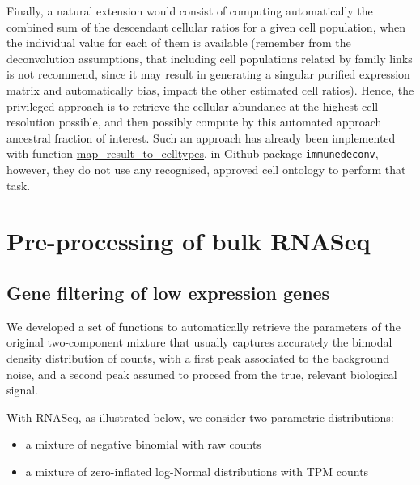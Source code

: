 Finally, a natural extension would consist of computing automatically the combined sum of the descendant cellular ratios for a given cell population, when the individual value for each of them is available (remember from the deconvolution assumptions, that including cell populations related by family links is not recommend, since it may result in generating a singular purified expression matrix and automatically bias, impact the other estimated cell ratios). Hence, the privileged approach is to retrieve the cellular abundance at the highest cell resolution possible, and then possibly compute by this automated approach ancestral fraction of interest. Such an approach has already been implemented with function \href{https://omnideconv.org/immunedeconv/reference/map_result_to_celltypes.html}{map\_result\_to\_celltypes}, in Github package \texttt{immunedeconv}, however, they do not use any recognised, approved cell ontology to perform that task.


\section{Pre-processing of bulk RNASeq} 
\label{pre-processing-of-bulk-rnaseq}


\subsection{Gene filtering of low expression genes} 
\label{gene-filtering-of-low-expression-genes}

We developed a set of functions to automatically retrieve the parameters of the original two-component mixture that usually captures accurately the bimodal density distribution of counts, with a first peak associated to the background noise, and a second peak assumed to proceed from the true, relevant biological signal.

With RNASeq, as illustrated below, we consider two parametric distributions:

\begin{itemize}
\item
  a mixture of negative binomial with raw counts
\item
  a mixture of zero-inflated log-Normal distributions with TPM counts
\end{itemize}

